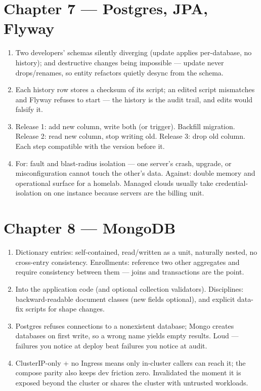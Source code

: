 \section*{Chapter 7 --- Postgres, JPA, Flyway}
\begin{enumerate}
  \item Two developers' schemas silently diverging (update applies
  per-database, no history); and destructive changes being impossible
  --- update never drops/renames, so entity refactors quietly desync
  from the schema.
  \item Each history row stores a checksum of its script; an edited
  script mismatches and Flyway refuses to start --- the history is
  the audit trail, and edits would falsify it.
  \item Release 1: add new column, write both (or trigger). Backfill
  migration. Release 2: read new column, stop writing old.
  Release 3: drop old column. Each step compatible with the version
  before it.
  \item For: fault and blast-radius isolation --- one server's crash,
  upgrade, or misconfiguration cannot touch the other's data. Against:
  double memory and operational surface for a homelab. Managed clouds
  usually take credential-isolation on one instance because servers
  are the billing unit.
\end{enumerate}

\section*{Chapter 8 --- MongoDB}
\begin{enumerate}
  \item Dictionary entries: self-contained, read/written as a unit,
  naturally nested, no cross-entry consistency. Enrollments: reference
  two other aggregates and require consistency between them --- joins
  and transactions are the point.
  \item Into the application code (and optional collection
  validators). Disciplines: backward-readable document classes (new
  fields optional), and explicit data-fix scripts for shape changes.
  \item Postgres refuses connections to a nonexistent database;
  Mongo creates databases on first write, so a wrong name yields
  empty results. Loud --- failures you notice at deploy beat failures
  you notice at audit.
  \item ClusterIP-only + no Ingress means only in-cluster callers can
  reach it; the compose parity also keeps dev friction zero.
  Invalidated the moment it is exposed beyond the cluster or shares
  the cluster with untrusted workloads.
\end{enumerate}

